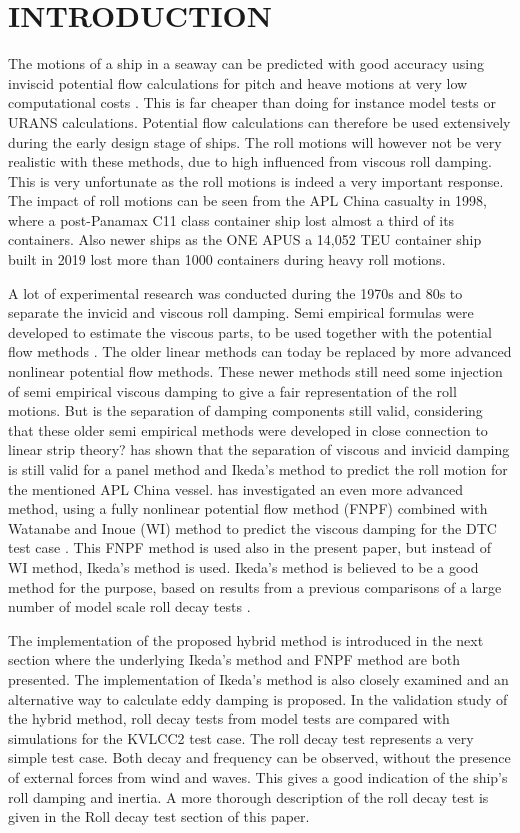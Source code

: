 \section*{INTRODUCTION}\label{introduction}

The motions of a ship in a seaway can be predicted with good accuracy
using inviscid potential flow calculations for pitch and heave motions
at very low computational costs \cite{7505983/FB64RGPF}. This is far
cheaper than doing for instance model tests or URANS calculations.
Potential flow calculations can therefore be used extensively during the
early design stage of ships. The roll motions will however not be very
realistic with these methods, due to high influenced from viscous roll
damping. This is very unfortunate as the roll motions is indeed a very
important response. The impact of roll motions can be seen from the APL
China casualty in 1998, where a post-Panamax C11 class container ship
lost almost a third of its containers. Also newer ships as the ONE APUS
a 14,052 TEU container ship built in 2019 lost more than 1000 containers
during heavy roll motions.

A lot of experimental research was conducted during the 1970s and 80s to
separate the invicid and viscous roll damping. Semi empirical formulas
were developed to estimate the viscous parts, to be used together with
the potential flow methods \cite{7505983/937PN5DT}. The older linear
methods can today be replaced by more advanced nonlinear potential flow
methods. These newer methods still need some injection of semi empirical
viscous damping to give a fair representation of the roll motions. But
is the separation of damping components still valid, considering that
these older semi empirical methods were developed in close connection to
linear strip theory? \cite{7505983/UGK6YEVD} has shown that the
separation of viscous and invicid damping is still valid for a panel
method and Ikeda's method to predict the roll motion for the mentioned
APL China vessel. \cite{7505983/24TNAV5Z} has investigated an even more
advanced method, using a fully nonlinear potential flow method (FNPF)
combined with Watanabe and Inoue (WI) method to predict the viscous
damping for the DTC test case \cite{7505983/BYNJ8CFG}. This FNPF method
is used also in the present paper, but instead of WI method, Ikeda's
method is used. Ikeda's method is believed to be a good method for the
purpose, based on results from a previous comparisons of a large number
of model scale roll decay tests \cite{7505983/QMGQ76Q9}.

The implementation of the proposed hybrid method is introduced in the
next section where the underlying Ikeda's method and FNPF method are
both presented. The implementation of Ikeda's method is also closely
examined and an alternative way to calculate eddy damping is proposed.
In the validation study of the hybrid method, roll decay tests from
model tests are compared with simulations for the KVLCC2 test case. The
roll decay test represents a very simple test case. Both decay and
frequency can be observed, without the presence of external forces from
wind and waves. This gives a good indication of the ship's roll damping
and inertia. A more thorough description of the roll decay test is given
in the Roll decay test section of this paper.

    